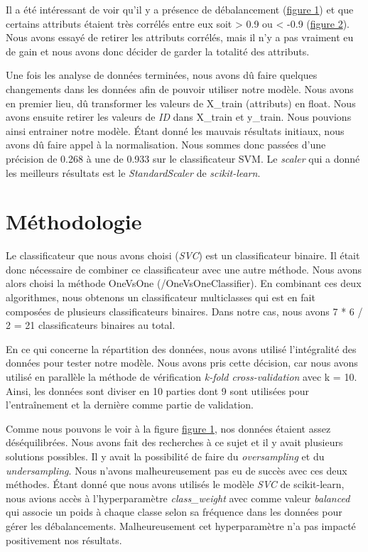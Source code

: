 \documentclass[12pt]{extarticle}
\begin{document}
\vspace{5mm}

Il a été intéressant de voir qu'il y a présence de débalancement (\hyperref[fig:barchart]{figure 1}) et que certains attributs étaient très corrélés entre eux soit > 0.9 ou < -0.9 (\hyperref[fig:heatmap]{figure 2}). Nous avons essayé de retirer les attributs corrélés, mais il n'y a pas vraiment eu de gain et nous avons donc décider de garder la totalité des attributs.

Une fois les analyse de données terminées, nous avons dû faire quelques changements dans les données afin de pouvoir utiliser notre modèle. Nous avons en premier lieu, dû transformer les valeurs de X\_train (attributs) en float. Nous avons ensuite retirer les valeurs de \emph{ID} dans X\_train et y\_train. Nous pouvions ainsi entrainer notre modèle. Étant donné les mauvais résultats initiaux, nous avons dû faire appel à la normalisation. Nous sommes donc passées d'une précision de 0.268 à une de 0.933 sur le classificateur SVM. Le \emph{scaler} qui a donné les meilleurs résultats est le \emph{StandardScaler} de \emph{scikit-learn}.

\section{Méthodologie}
\label{sec:org86a1795}
Le classificateur que nous avons choisi (\emph{SVC}) est un classificateur binaire. Il était donc nécessaire de combiner ce classificateur avec une autre méthode. Nous avons alors choisi la méthode OneVsOne (/OneVsOneClassifier). En combinant ces deux algorithmes, nous obtenons un classificateur multiclasses qui est en fait composées de plusieurs classificateurs binaires. Dans notre cas, nous avons 7 * 6 / 2 = 21 classificateurs binaires au total.

En ce qui concerne la répartition des données, nous avons utilisé l'intégralité des données pour tester notre modèle. Nous avons pris cette décision, car nous avons utilisé en parallèle la méthode de vérification \emph{k-fold cross-validation} avec k = 10. Ainsi, les données sont diviser en 10 parties dont 9 sont utilisées pour l'entraînement et la dernière comme partie de validation.

Comme nous pouvons le voir à la figure \hyperref[fig:barchart]{figure 1}, nos données étaient assez déséquilibrées. Nous avons fait des recherches à ce sujet et il y avait plusieurs solutions possibles. Il y avait la possibilité de faire du \emph{oversampling} et du \emph{undersampling}. Nous n'avons malheureusement pas eu de succès avec ces deux méthodes. Étant donné que nous avons utilisés le modèle \emph{SVC} de scikit-learn, nous avions accès à l'hyperparamètre \emph{class\_weight} avec comme valeur \emph{balanced} qui associe un poids à chaque classe selon sa fréquence dans les données pour gérer les débalancements. Malheureusement cet hyperparamètre n'a pas impacté positivement nos résultats.
\end{document}
